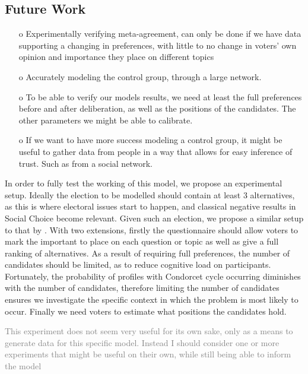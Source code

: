 \subsection{Future Work}


\begin{itemize}
	\item [o] Experimentally verifying meta-agreement, can only be done if we have data supporting a changing in preferences, with little to no change in voters' own opinion and importance they place on different topics
	\item [o] Accurately modeling the control group, through a large network.
	\item[o] To be able to verify our models results, we need at least the full preferences before and after deliberation, as well as the positions of the candidates. The other parameters we might be able to calibrate.
	\item[o] If we want to have more success modeling a control group, it might be useful to gather data from people in a way that allows for easy inference of trust. Such as from a social network.
\end{itemize}


In order to fully test the working of this model, we propose an experimental
setup. Ideally the election to be modelled should contain at least 3
alternatives, as this is where electoral issues start to happen, and classical
negative results in Social Choice become relevant. Given such an election, we
propose a similar setup to that by \citet{fishkinCanDeliberationHave2024}. With
two extensions, firstly the questionnaire should allow voters to mark the
important to place on each question or topic as well as give a full ranking of
alternatives. As a result of requiring full preferences, the number of
candidates should be limited, as to reduce cognitive load on participants.
Fortunately, the probability of profiles with Condorcet cycle occurring
diminishes with the number of candidates, therefore limiting the number of
candidates ensures we investigate the specific context in which the problem is
most likely to occur. Finally we need voters to estimate what positions the candidates hold.

\textcolor{gray}{This experiment does not seem very useful for its own sake, only as a means to generate data for this specific model. Instead I should consider one or more experiments that might be useful on their own, while still being able to inform the model}
